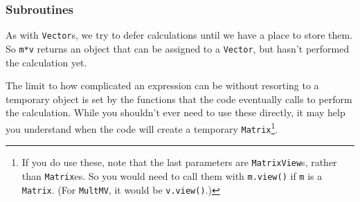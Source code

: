 \documentclass[twoside,letterpaper,11pt]{article}
\renewcommand{\tt}[1]{{\lstinline {#1}}}
\begin{document}
\subsubsection{Subroutines}

As with \tt{Vector}s, we try to defer calculations until we have a place to store them.
So \tt{m*v} returns an object that can be assigned to a \tt{Vector},
but hasn't performed the calculation yet.  

The limit to how complicated an expression can be without resorting to a temporary object
is set by the 
functions that the code eventually calls to perform the calculation.  
While you shouldn't ever
need to use these directly, it may help you understand when the code will create a
temporary \tt{Matrix}\footnote{If you do use these, note that the last parameters are
\tt{MatrixView}s, rather than \tt{Matrix}es.  So you would need to 
call them with \tt{m.view()} if \tt{m} is a \tt{Matrix}.  (For \tt{MultMV},
it would be \tt{v.view()}.)}.
\end{document}
